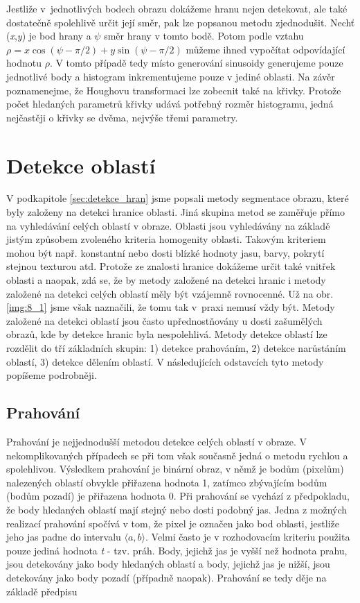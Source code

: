 Jestliže v~jednotlivých bodech obrazu dokážeme hranu nejen detekovat, ale také dostatečně spolehlivě určit její směr, pak lze popsanou metodu zjednodušit. Nechť (\textit{x},\textit{y}) je bod hrany a $\psi$ směr hrany v tomto bodě. Potom podle vztahu $\rho = x \cos(\psi-\pi/2) + y \sin(\psi-\pi/2)$ můžeme ihned vypočítat odpovídající hodnotu $\rho$. V tomto případě tedy místo generování sinusoidy generujeme pouze jednotlivé body a histogram inkrementujeme pouze v jediné oblasti. Na závěr poznamenejme, že Houghovu transformaci lze zobecnit také na křivky. Protože počet hledaných parametrů křivky udává potřebný rozměr histogramu, jedná nejčastěji o křivky se dvěma, nejvýše třemi parametry.

\section*{Detekce oblastí}

V podkapitole \ref{sec:detekce_hran} jsme popsali metody segmentace obrazu, které byly založeny na detekci hranice oblasti. Jiná skupina metod se zaměřuje přímo na vyhledávání celých oblastí v obraze. Oblasti jsou vyhledávány na základě jistým způsobem zvoleného kriteria homogenity oblasti. Takovým kriteriem mohou být např. konstantní nebo dosti blízké hodnoty jasu, barvy, pokrytí stejnou texturou atd. Protože ze znalosti hranice dokážeme určit také vnitřek oblasti a naopak, zdá se, že by metody založené na detekci hranic i metody založené na detekci celých oblastí měly být vzájemně rovnocenné. Už na obr. \ref{img:8_1} jsme však naznačili, že tomu tak v~praxi nemusí vždy být. Metody založené na detekci oblastí jsou často upřednostňovány u dosti zašumělých obrazů, kde by detekce hranic byla nespolehlivá. Metody detekce oblastí lze rozdělit do tří základních skupin: 1) detekce prahováním, 2) detekce narůstáním oblastí, 3) detekce dělením oblastí. V následujících odstavcích tyto metody popíšeme podrobněji.

\subsection*{Prahování}

Prahování je nejjednodušší metodou detekce celých oblastí v obraze. V nekomplikovaných případech se při tom však současně jedná o metodu rychlou a spolehlivou. Výsledkem prahování je binární obraz, v němž je bodům (pixelům) nalezených oblastí obvykle přiřazena hodnota 1, zatímco zbývajícím bodům (bodům pozadí) je přiřazena hodnota 0. Při prahování se vychází z předpokladu, že body hledaných oblastí mají stejný nebo dosti podobný jas. Jedna z možných realizací prahování spočívá v tom, že pixel je označen jako bod oblasti, jestliže jeho jas padne do intervalu $\langle a, b\rangle$. Velmi často je v rozhodovacím kriteriu použita pouze jediná hodnota \textit{t} - tzv. práh. Body, jejichž jas je vyšší než hodnota prahu, jsou detekovány jako body hledaných oblastí a body, jejichž jas je nižší, jsou detekovány jako body pozadí (případně naopak). Prahování se tedy děje na základě předpisu

